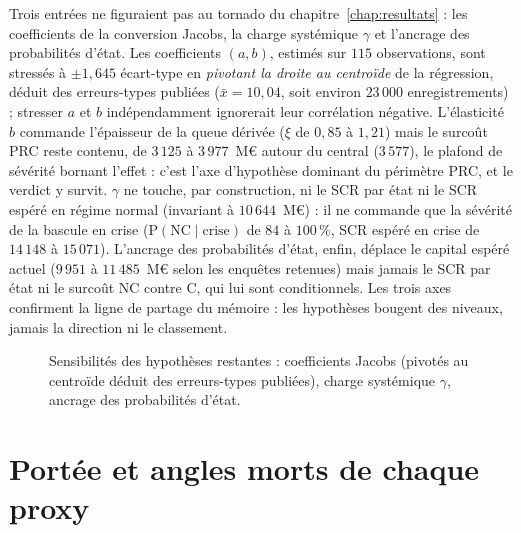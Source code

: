 Trois entrées ne figuraient pas au tornado du chapitre~\ref{chap:resultats} : les coefficients
de la conversion Jacobs, la charge systémique $\gamma$ et l'ancrage des probabilités d'état.
Les coefficients $(a,b)$, estimés sur $115$ observations, sont stressés à $\pm 1{,}645$
écart-type en \emph{pivotant la droite au centroïde} de la régression, déduit des erreurs-types
publiées ($\bar{x} = 10{,}04$, soit environ $23\,000$ enregistrements) ; stresser $a$ et $b$
indépendamment ignorerait leur corrélation négative. L'élasticité $b$ commande l'épaisseur de
la queue dérivée ($\xi$ de $0{,}85$ à $1{,}21$) mais le surcoût PRC reste contenu, de $3\,125$
à $3\,977$~M\euro{} autour du central ($3\,577$), le plafond de sévérité bornant l'effet :
c'est l'axe d'hypothèse dominant du périmètre PRC, et le verdict y survit. $\gamma$ ne touche,
par construction, ni le SCR par état ni le SCR espéré en régime normal (invariant à
$10\,644$~M\euro) : il ne commande que la sévérité de la bascule en crise
($\mathrm{P}(\text{NC} \mid \text{crise})$ de $84$ à $100\,\%$, SCR espéré en crise de
$14\,148$ à $15\,071$). L'ancrage des probabilités d'état, enfin, déplace le capital espéré
actuel ($9\,951$ à $11\,485$~M\euro{} selon les enquêtes retenues) mais jamais le SCR par état
ni le surcoût NC contre C, qui lui sont conditionnels. Les trois axes confirment la ligne de
partage du mémoire : les hypothèses bougent des niveaux, jamais la direction ni le classement.

\begin{figure}[htbp]\centering
{}
\caption{Sensibilités des hypothèses restantes : coefficients Jacobs (pivotés au centroïde
déduit des erreurs-types publiées), charge systémique $\gamma$, ancrage des probabilités
d'état.}
\label{fig:hypotheses}
\end{figure}

\section{Portée et angles morts de chaque proxy}
\label{sec:ann-proxys}

%

